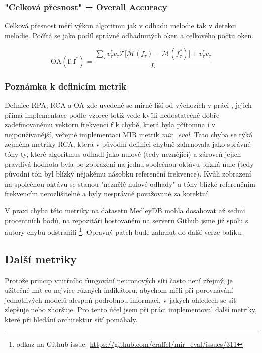 \subsubsection{"Celková přesnost" = Overall Accuracy}

Celková přesnost měří výkon algoritmu jak v odhadu melodie tak v detekci melodie. Počítá se jako podíl správně odhadnutých oken a celkového počtu oken.

    $$\mathrm{OA}(\mathbf{f}, \mathbf{f^*}) = \frac{\sum_\tau{v^*_\tau v_\tau \mathcal{T}[\mathcal{M}(f_\tau) - \mathcal{M}(f^*_\tau)}] + \bar{v}^*_\tau \bar{v}_\tau }{L}$$



\subsubsection{Poznámka k definicím metrik}

Definice RPA, RCA a OA zde uvedené se mírně liší od výchozích v práci \cite{Salamon2014}, jejich přímá implementace podle vzorce totiž vede kvůli nedostatečně dobře zadefinovanému vektoru frekvencí $\mathbf{f}$ k chybě, která byla přítomna i v nejpoužívanější, veřejné implementaci MIR metrik \textit{mir\_eval}. Tato chyba se týká zejména metriky RCA, která v původní definici chybně zahrnovala jako správné tóny ty, které algoritmus odhadl jako nulové (tedy neznějící) a zároveň jejich pravdivá hodnota byla po zobrazení na jednu společnou oktávu blízká nule (tedy původní tón byl blízký nějakému násobku referenční frekvence). Kvůli zobrazení na společnou oktávu se stanou "neznělé nulové odhady" a tóny blízké referenčním frekvencím nerozlišitelné a byly nesprávně považované za korektní.

V praxi chyba této metriky na datasetu MedleyDB mohla dosahovat až sedmi procentních bodů, na repozitáři hostovaném na serveru Github jsme již spolu s autory chybu odstranili \footnote{odkaz na Github issue: \url{https://github.com/craffel/mir_eval/issues/311}}. Opravný patch bude zahrnut do další verze balíku.

\subsection{Další metriky}

Protože princip vnitřního fungování neuronových sítí často není zřejmý, je užitečné mít co nejvíce různých indikátorů, abychom měli při porovnávání jednotlivých modelů alespoň podrobnou informaci, v jakých ohledech se síť zlepšuje nebo zhoršuje. Pro tento účel jsem při práci implementoval další metriky, které při hledání architektur sítí pomáhaly.

